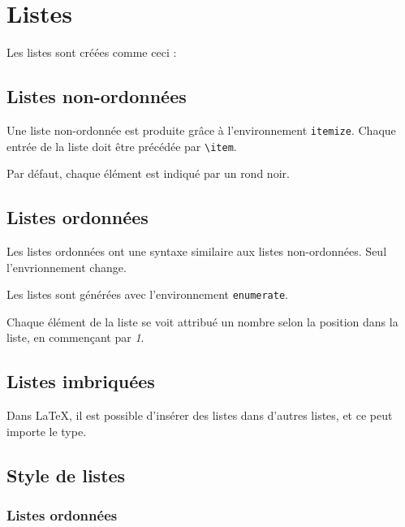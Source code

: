 \section{Listes}

Les listes sont créées comme ceci :



\subsection{Listes non-ordonnées}

Une liste non-ordonnée est produite grâce à l'environnement \texttt{itemize}.
Chaque entrée de la liste doit être précédée par \lstinline|\item|.



Par défaut, chaque élément est indiqué par un rond noir.

\subsection{Listes ordonnées}

Les listes ordonnées ont une syntaxe similaire aux listes non-ordonnées.
Seul l'envrionnement change.

Les listes sont générées avec l'environnement \texttt{enumerate}.



Chaque élément de la liste se voit attribué un nombre selon la position dans la liste, en commençant par \emph{1}.

\subsection{Listes imbriquées}

Dans \LaTeX, il est possible d'insérer des listes dans d'autres listes, et ce peut importe le type.



\subsection{Style de listes}

\subsubsection{Listes ordonnées}

